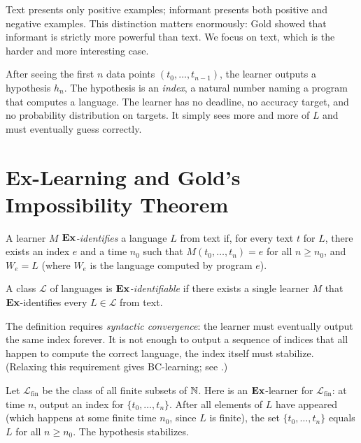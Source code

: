 Text presents only positive examples; informant presents both positive and negative examples. This distinction matters enormously: Gold showed that informant is strictly more powerful than text. We focus on text, which is the harder and more interesting case.

After seeing the first $n$ data points $(t_0, \ldots, t_{n-1})$, the learner outputs a hypothesis $h_n$. The hypothesis is an \emph{index}, a natural number naming a program that computes a language. The learner has no deadline, no accuracy target, and no probability distribution on targets. It simply sees more and more of $L$ and must eventually guess correctly.


\section{Ex-Learning and Gold's Impossibility Theorem}
\label{sec:ex-gold}

\begin{defn}
\label{def:ex-learning}
  \leanok
A learner $M$ \emph{$\mathbf{Ex}$-identifies} a language $L$ from text if, for every text $t$ for $L$, there exists an index $e$ and a time $n_0$ such that $M(t_0, \ldots, t_n) = e$ for all $n \geq n_0$, and $W_e = L$ (where $W_e$ is the language computed by program $e$).

A class $\mathcal{L}$ of languages is \emph{$\mathbf{Ex}$-identifiable} if there exists a single learner $M$ that $\mathbf{Ex}$-identifies every $L \in \mathcal{L}$ from text.
\end{defn}

The definition requires \emph{syntactic convergence}: the learner must eventually output the same index forever. It is not enough to output a sequence of indices that all happen to compute the correct language, the index itself must stabilize. (Relaxing this requirement gives BC-learning; see .)

\begin{example}
\label{ex:finite-languages}
Let $\mathcal{L}_{\mathrm{fin}}$ be the class of all finite subsets of $\mathbb{N}$. Here is an $\mathbf{Ex}$-learner for $\mathcal{L}_{\mathrm{fin}}$: at time $n$, output an index for $\{t_0, \ldots, t_n\}$. After all elements of $L$ have appeared (which happens at some finite time $n_0$, since $L$ is finite), the set $\{t_0, \ldots, t_n\}$ equals $L$ for all $n \geq n_0$. The hypothesis stabilizes.
\end{example}

